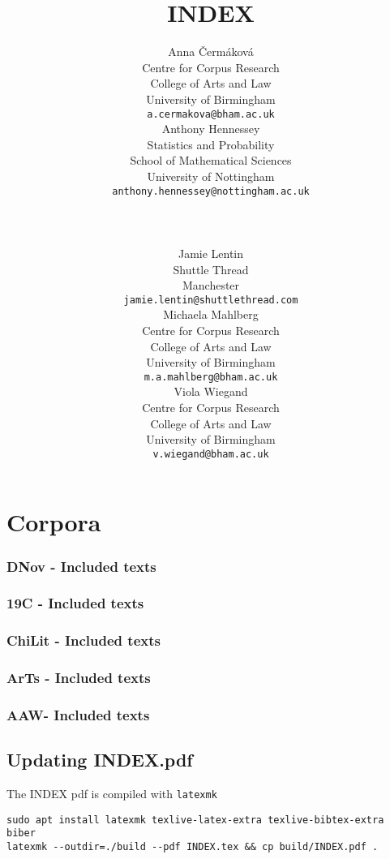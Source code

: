\documentclass[a4paper,10pt]{paper}
\date{}
\author{
    \scriptsize
    \parbox{0.25\textwidth}{
       \small
       Anna Čermáková \\
       \scriptsize
       Centre for Corpus Research\\ College of Arts and Law\\ University of Birmingham\\
       \texttt{a.cermakova@bham.ac.uk}
    }
    \parbox{0.30\textwidth}{
        \small Anthony Hennessey \\
        \scriptsize
        Statistics and Probability\\ School of Mathematical Sciences\\ University of Nottingham \\
        \texttt{anthony.hennessey@nottingham.ac.uk}
    }
    \\ \\
    \parbox{0.30\textwidth}{
       \small
       Jamie Lentin \\
       \scriptsize
       Shuttle Thread\\ Manchester \\
       \texttt{jamie.lentin@shuttlethread.com}
    }
    \parbox{0.25\textwidth}{
       \small
       Michaela Mahlberg \\
       \scriptsize
       Centre for Corpus Research\\ College of Arts and Law\\ University of Birmingham \\
       \texttt{m.a.mahlberg@bham.ac.uk}
    }
    \parbox{0.25\textwidth}{
       \small
       Viola Wiegand \\
       \scriptsize
       Centre for Corpus Research\\ College of Arts and Law\\ University of Birmingham \\
       \texttt{v.wiegand@bham.ac.uk}
    }
}
\title{INDEX}
\begin{document}
\nocite{*}

\maketitle

\tableofcontents

\section{Corpora}

\printbibliography[heading=none,keyword=corpus]

\subsubsection{DNov - Included texts}

\printbibliography[heading=none,keyword=DNov]

\subsubsection{19C - Included texts}

\printbibliography[heading=none,keyword=19C]

\subsubsection{ChiLit - Included texts}

\printbibliography[heading=none,keyword=ChiLit]

\subsubsection{ArTs - Included texts}

\printbibliography[heading=none,keyword=ArTs]

\subsubsection{AAW- Included texts}

\printbibliography[heading=none,keyword=AAW]

\subsection{Updating INDEX.pdf} \label{se:update_index}
The INDEX pdf is compiled with \texttt{latexmk}
\begin{verbatim}
sudo apt install latexmk texlive-latex-extra texlive-bibtex-extra biber
latexmk --outdir=./build --pdf INDEX.tex && cp build/INDEX.pdf .
\end{verbatim}
\end{document}
